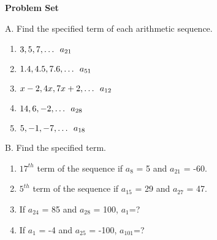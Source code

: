 \textbf{Problem Set}

\vspce

A. Find the specified term of each arithmetic sequence.    
\begin{enumerate}
\item \hspce  $3, 5, 7,\ldots \hspace{0.5em}   a_{21}$
\item \hspce $1.4, 4.5, 7.6,\ldots \hspace{0.5em}   a_{51}$
\item \hspce $x-2, 4x, 7x+2,\ldots \hspace{0.5em}   a_{12}$
\item \hspce $14, 6, -2,\ldots \hspace{0.5em}   a_{28}$
\item \hspce $5, -1, -7,\ldots \hspace{0.5em}   a_{18}$
\end{enumerate}

B. Find the specified term.   
\begin{enumerate}

\item  \hspce $17^{th}$ term of the sequence if  $a_{8}$ = 5 and $a_{21}$ = -60.
\item \hspce $5^{th}$ term of the sequence if  $a_{15}$ = 29 and $a_{27}$ = 47.
\item \hspce If $a_{24}$ = 85 and $a_{28}$ = 100, $a_{1}$=?
\item \hspce If $a_{1}$ = -4 and $a_{25}$ = -100, $a_{101}$=?
\end{enumerate}